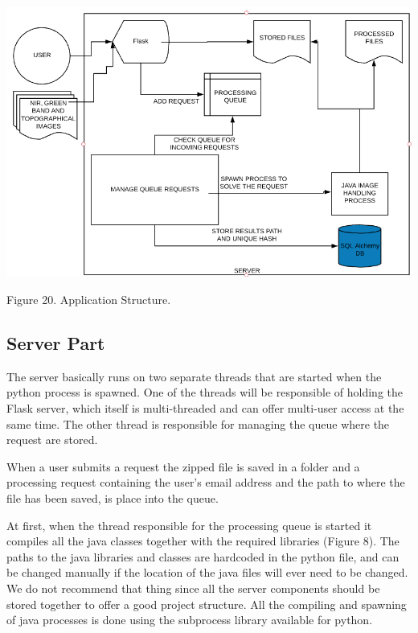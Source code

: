 \documentclass[12pt, a4paper]{report}
\begin{document}
\includegraphics[scale=0.7, right]{application_overview.png}
\begin{center}
Figure 20. Application Structure.
\end{center}
\par 

\subsection{Server Part}

\quad 
The server basically runs on two separate threads that are started when the python process is spawned. One of the threads will be responsible of holding the Flask server, which itself is multi-threaded and can offer multi-user access at the same time. The other thread is responsible for managing the queue where the request are stored.
\par 

When a user submits a request the zipped file is saved in a folder and a processing request containing the user's email address and the path to where the file has been saved, is place into the queue. 
\par 

At first, when the thread responsible for the processing queue is started it compiles all the java classes together with the required libraries (Figure 8). The paths to the java libraries and classes are hardcoded in the python file, and can be changed manually if the location of the java files will ever need to be changed. We do not recommend that thing since all the server components should be stored together to offer a good project structure. All the compiling and spawning of java processes is done using the subprocess library available for python. 
\par 
\end{document}
